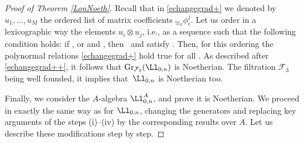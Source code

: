 \begin{proof}[Proof of Theorem \ref{LonNoeth}]
Recall that in \eqref{echangegrad+} we denoted by $u_1,\dots,u_M$ the ordered list of matrix coefficients ${}_{\varpi_k}\phi_{i}^{j}$. Let us order in a lexicographic way the elements $u_i\otimes u_j$, i.e., as a sequence  such that the following condition holds: if , or  and , then~ and  satisfy . Then, for this ordering the polynormal relations \eqref{echangegrad+} hold true for all . As described after \eqref{echangegrad++}, it follows that ${\rm Gr}_{\mathcal{F}_3}(\Ll_{0,n})$ is Noetherian. The filtration $\mathcal{F}_3$ being well founded, it implies that~$\Ll_{0,n}$ is Noetherian too.

Finally, we consider the $A$-algebra $\Ll_{0,n}^A$, and prove it is Noetherian. We proceed in exactly the same way as for $\Ll_{0,n}$, changing the generators and replacing key arguments of the steps (i)--(iv) by the corresponding results over $A$. Let us describe these modifications step by step.


\end{proof}
